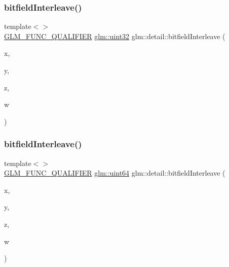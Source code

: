 \mbox{\label{namespaceglm_1_1detail_ae3f57ec9a2b938eb31978ccb99f85474}} 
\subsubsection{\texorpdfstring{bitfield\+Interleave()}{bitfieldInterleave()}\hspace{0.1cm}{\footnotesize\ttfamily [10/11]}}
{\footnotesize\ttfamily template$<$$>$ \\
\hyperlink{setup_8hpp_a33fdea6f91c5f834105f7415e2a64407}{G\+L\+M\+\_\+\+F\+U\+N\+C\+\_\+\+Q\+U\+A\+L\+I\+F\+I\+ER} \hyperlink{group__gtc__type__precision_ga202b6a53c105fcb7e531f9b443518451}{glm\+::uint32} glm\+::detail\+::bitfield\+Interleave (\begin{DoxyParamCaption}\item[{\hyperlink{group__gtc__type__precision_ga1a7dcd8aac97cc8020817c94049deff2}{glm\+::uint8}}]{x,  }\item[{\hyperlink{group__gtc__type__precision_ga1a7dcd8aac97cc8020817c94049deff2}{glm\+::uint8}}]{y,  }\item[{\hyperlink{group__gtc__type__precision_ga1a7dcd8aac97cc8020817c94049deff2}{glm\+::uint8}}]{z,  }\item[{\hyperlink{group__gtc__type__precision_ga1a7dcd8aac97cc8020817c94049deff2}{glm\+::uint8}}]{w }\end{DoxyParamCaption})}

\mbox{\label{namespaceglm_1_1detail_a3ed141c5adbf2e1209ffe2081d98ba4c}} 
\subsubsection{\texorpdfstring{bitfield\+Interleave()}{bitfieldInterleave()}\hspace{0.1cm}{\footnotesize\ttfamily [11/11]}}
{\footnotesize\ttfamily template$<$$>$ \\
\hyperlink{setup_8hpp_a33fdea6f91c5f834105f7415e2a64407}{G\+L\+M\+\_\+\+F\+U\+N\+C\+\_\+\+Q\+U\+A\+L\+I\+F\+I\+ER} \hyperlink{group__gtc__type__precision_gae3632bf9b37da66233d78930dd06378a}{glm\+::uint64} glm\+::detail\+::bitfield\+Interleave (\begin{DoxyParamCaption}\item[{\hyperlink{group__gtc__type__precision_gad8c2939e1fdd8e5828b31d95c52255d5}{glm\+::uint16}}]{x,  }\item[{\hyperlink{group__gtc__type__precision_gad8c2939e1fdd8e5828b31d95c52255d5}{glm\+::uint16}}]{y,  }\item[{\hyperlink{group__gtc__type__precision_gad8c2939e1fdd8e5828b31d95c52255d5}{glm\+::uint16}}]{z,  }\item[{\hyperlink{group__gtc__type__precision_gad8c2939e1fdd8e5828b31d95c52255d5}{glm\+::uint16}}]{w }\end{DoxyParamCaption})}


